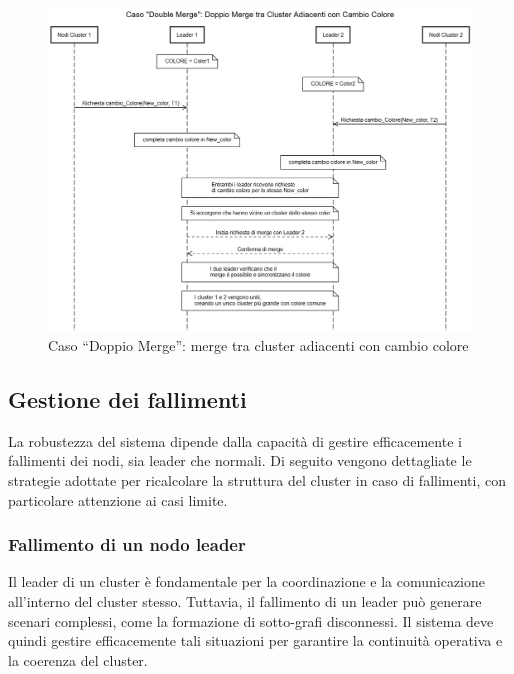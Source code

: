\documentclass[12pt, a4paper]{report}
\begin{document}
\begin{figure}[H]
    \centering
    \includegraphics[width=1\textwidth,align=t]{images/concorrenza/doubleMerge.png}
    \caption{Caso ``Doppio Merge'': merge tra cluster adiacenti con cambio colore}
    \label{fig:double_merge}
\end{figure}

\subsection{Gestione dei fallimenti}\label{subsec:gestione_fallimenti}

La robustezza del sistema dipende dalla capacit\`a di gestire efficacemente i fallimenti dei nodi, sia leader che normali. Di seguito vengono dettagliate le strategie adottate per ricalcolare la struttura del cluster in caso di fallimenti, con particolare attenzione ai casi limite.

\subsubsection{Fallimento di un nodo leader}
\label{subsubsec:fallimento_leader}
Il leader di un cluster \`e fondamentale per la coordinazione e la comunicazione all'interno del cluster stesso. Tuttavia, il fallimento di un leader pu\`o generare scenari complessi, come la formazione di sotto-grafi disconnessi. Il sistema deve quindi gestire efficacemente tali situazioni per garantire la continuit\`a operativa e la coerenza del cluster.
\end{document}
